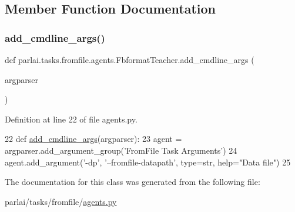 \subsection{Member Function Documentation}
\mbox{\label{classparlai_1_1tasks_1_1fromfile_1_1agents_1_1FbformatTeacher_a520aa7b0b4f3a80512f4cc8fd554eab9}} 
\subsubsection{\texorpdfstring{add\+\_\+cmdline\+\_\+args()}{add\_cmdline\_args()}}
{\footnotesize\ttfamily def parlai.\+tasks.\+fromfile.\+agents.\+Fbformat\+Teacher.\+add\+\_\+cmdline\+\_\+args (\begin{DoxyParamCaption}\item[{}]{argparser }\end{DoxyParamCaption})\hspace{0.3cm}{\ttfamily [static]}}



Definition at line 22 of file agents.\+py.


\begin{DoxyCode}
22     \textcolor{keyword}{def }\hyperlink{namespaceparlai_1_1agents_1_1drqa_1_1config_a62fdd5554f1da6be0cba185271058320}{add\_cmdline\_args}(argparser):
23         agent = argparser.add\_argument\_group(\textcolor{stringliteral}{'FromFile Task Arguments'})
24         agent.add\_argument(\textcolor{stringliteral}{'-dp'}, \textcolor{stringliteral}{'--fromfile-datapath'}, type=str, help=\textcolor{stringliteral}{"Data file"})
25 
\end{DoxyCode}


The documentation for this class was generated from the following file\+:\begin{DoxyCompactItemize}
\item 
parlai/tasks/fromfile/\hyperlink{parlai_2tasks_2fromfile_2agents_8py}{agents.\+py}\end{DoxyCompactItemize}
